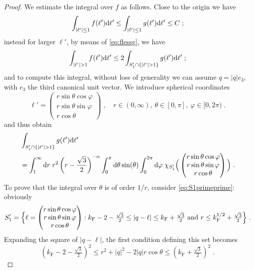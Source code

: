 \documentclass[12pt,a4paper]{article}
\numberwithin{equation}{section}
\newcommand{\1}{\mathbb{I}}
\newcommand{\di}{\textnormal{d}}
\newcommand{\F}{\mathrm{F}}
\newcommand{\kF}{k_\F}
\theoremstyle{plain}
\theoremstyle{definition}
\theoremstyle{remark}
\theoremstyle{plain}
\theoremstyle{definition}
\theoremstyle{remark}
\begin{document}
\begin{proof}
We estimate the integral over $f$ as follows. Close to the origin we have
\begin{equation}\label{eq:A}
	\int_{\lvert \ell'\rvert \leq 1} f(\ell') \di \ell' \leq \int_{\lvert \ell'\rvert \leq 1} g(\ell') \di \ell' \leq C \;;
\end{equation}
instead for larger $\ell'$, by means of \eqref{eq:flessg}, we have
\[
	\int_{\lvert \ell' \rvert > 1} f(\ell') \di \ell' \leq 2 \int_{S_1' \cap \{\lvert
	\ell' \rvert > 1\}} g(\ell') \di \ell' \;;
\]
and to compute this integral, without loss of generality we can assume $q = \lvert q \rvert e_3$, with $e_3$ the third canonical unit vector. We introduce spherical coordinates
\[
   \ell' = \begin{pmatrix}r \sin \theta \cos \varphi\\ r \sin \theta \sin \varphi \\ r \cos\theta\end{pmatrix} \;, \quad r \in (0,\infty),\ \theta \in [0,\pi],\ \varphi \in [0,2\pi) \;.
\]
and thus obtain
\begin{align}\label{eq:inte}
\begin{split}
 & \int_{S_1' \cap \{\lvert
	\ell' \rvert > 1\}} g(\ell') \di \ell' \\
	& = \int_1^{\infty} \di r\; r^2 \left( r - \frac{\sqrt{3}}{2} \right)^{-\alpha} \int_{0}^\pi \di \theta \sin(\theta) \int_0^{2\pi} \di\varphi\; \chi_{S_1'}\Big(\begin{pmatrix}r \sin \theta \cos \varphi\\ r \sin \theta \sin \varphi \\ r \cos\theta\end{pmatrix}\Big) \;.
\end{split}
\end{align}
To prove that the integral over $\theta$ is of order $1/r$, consider \eqref{eq:S1primeprime}:  obviously
 \begin{align*}
   S_1' = \Big\{ \ell  = \begin{pmatrix}r \sin \theta \cos \varphi\\ r \sin \theta \sin \varphi \\ r \cos\theta\end{pmatrix}: \kF - 2 - \tfrac{\sqrt{3}}{2} \leq \lvert q - \ell \rvert \leq \kF + \tfrac{\sqrt{3}}{2} \textnormal{ and } r \leq \kF^{1/2} + \tfrac{\sqrt{3}}{2} \Big\} \;.
 \end{align*}
Expanding the square of $\lvert q -\ell \rvert$, the first condition defining this set becomes
\[
		\left( \kF-2 - \tfrac{\sqrt{3}}{2} \right)^2 \leq r^2 + \lvert q\rvert^2 - 2 \lvert q\rvert r \cos \theta \leq \left( \kF+ \tfrac{\sqrt{3}}{2} \right)^2 \;.
\]
\end{proof}
\end{document}
